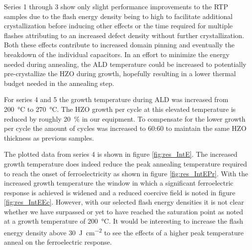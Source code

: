 \documentclass[11pt,twoside,final]{eitExjobb}  %
\begin{document}
Series 1 through 3 show only slight performance improvements to the RTP
samples due to the flash energy density being to high to facilitate additional
crystallization before inducing other effects or the time required for multiple
flashes attributing to an increased defect density without further
crystallization. Both these effects contribute to increased domain pinning and
eventually the breakdown of the individual capacitors. In an effort to minimize the
energy needed during annealing, the ALD temperature could be increased to
potentially pre-crystallize the HZO during growth, hopefully resulting in a
lower thermal budget needed in the annealing step.

For series 4 and 5 the growth temperature during ALD was
increased from \SI{200}{\celsius} to \SI{270}{\celsius}. The HZO growth per
cycle at this elevated temperature is reduced by roughly \SI{20}{\percent} in
our equipment. To compensate for the lower growth per cycle the amount of cycles
was increased to 60:60 to maintain the same HZO thickness as previous samples.

The plotted data from series 4 is shown in figure \ref{fig:res_IntE}. The
increased growth temperature does indeed reduce the peak annealing temperature
required to reach the onset of ferroelectricity as shown in
figure \ref{fig:res_IntEPr}. With the increased growth temperature the window in
which a significant ferroelectric response is achieved is widened and a reduced
coercive field is noted in figure \ref{fig:res_IntEEc}. However, with our
selected flash energy densities it is not clear whether we have surpassed
or yet to have reached the saturation point as noted at a growth temperature of
\SI{200}{\celsius}. It would be interesting to increase the flash energy
density above \SI{30}{\joule\per\centi\meter\squared} to see the effects of a
higher peak temperature anneal on the ferroelectric response.
\end{document}

